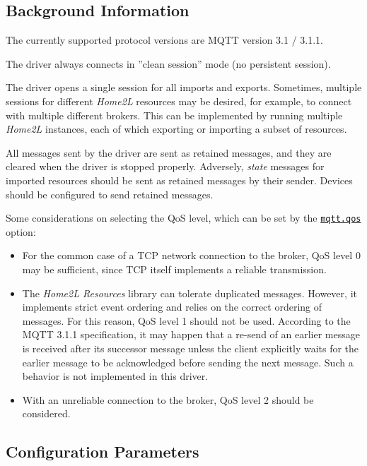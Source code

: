 \documentclass[12pt,english,parskip=half,headheight=19pt]{scrreprt}
\newcommand{\idx}[1]{#1\index{#1}}
\newcommand{\refenv}[1]{\hyperref[env:#1]{\texttt{#1}}}        %
\begin{document}
\subsection{Background Information}
\label{sec:drvlib-mqtt-details}

The currently supported protocol versions are MQTT version 3.1 / 3.1.1.

The driver always connects in ''clean session'' mode (no persistent session).

The driver opens a single session for all imports and exports. Sometimes, multiple sessions for different \textit{Home2L} resources may be desired, for example, to connect with multiple different brokers. This can be implemented by running multiple \textit{Home2L} instances, each of which exporting or importing a subset of resources.

All messages sent by the driver are sent as retained messages, and they are cleared when the driver is stopped properly. Adversely, \textit{state} messages for imported resources should be sent as retained messages by their sender. Devices should be configured to send retained messages.

Some considerations on selecting the QoS level, which can be set by the \refenv{mqtt.qos} option:
\begin{itemize}
  \item For the common case of a TCP network connection to the broker, QoS level 0
      may be sufficient, since TCP itself implements a reliable transmission.
  \item The \textit{Home2L Resources} library can tolerate duplicated messages. However, it implements strict event
      ordering and relies on the correct ordering of messages. For this reason, QoS level 1 should not be used.
      According to the MQTT 3.1.1 specification, it may happen that a re-send of an earlier message
      is received after its successor message unless the client explicitly waits for the earlier message
      to be acknowledged before sending the next message. Such a behavior is not implemented in this driver.
  \item With an unreliable connection to the broker, QoS level 2 should be considered.
\end{itemize}



\subsection{Configuration Parameters}
\label{sec:drvlib-mqtt-env}

\end{document}
